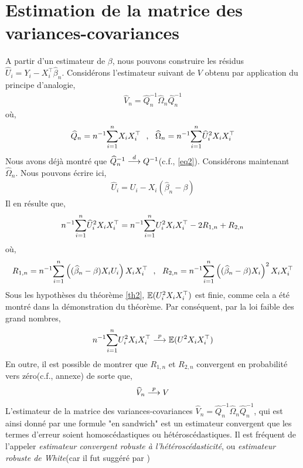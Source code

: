 \documentclass[12pt, reqno]{amsart}
\begin{document}
\section{Estimation de la matrice des variances-covariances}
A partir d'un estimateur de $\beta$, nous pouvons construire les résidus $\widehat{U}_i = Y_i - X_i^\top \widehat{\beta}_n$.  Considérons l'estimateur suivant de $V$ obtenu par application du principe d'analogie,
\begin{align*}
\widehat{V}_n = \widehat{Q}_n^{-1} \widehat{\Omega}_n \widehat{Q}_n^{-1}
\end{align*}
où,
\begin{align*}
\widehat{Q}_n = n^{-1}\underset{i=1}{\overset{n}{\sum}} X_iX_i^\top \ \ , \ \ \widehat{\Omega}_n = n^{-1}\underset{i=1}{\overset{n}{\sum}} \widehat{U}_i^2 X_iX_i^\top
\end{align*}
Nous avons déjà montré que $\widehat{Q}_n ^{-1} \overset{d}{\longrightarrow} Q^{-1}$(c.f., \eqref{eq2}). Considérons maintenant $\widehat{\Omega}_n$. Nous pouvons écrire ici,
\begin{align*}
 \widehat{U}_i  = U_i - X_i(\widehat{\beta}_n - \beta)
\end{align*}
Il en résulte que,
\begin{align}
n^{-1}\underset{i=1}{\overset{n}{\sum}} \widehat{U}_i^2 X_iX_i^\top = n^{-1} \underset{i=1}{\overset{n}{\sum}} U_i^2X_iX_i^\top - 2R_{1,n} + R_{2,n}
\label{eq5}
\end{align}
où,
\begin{align*}
R_{1,n} = n^{-1} \sumobs \left((\widehat{\beta}_n - \beta)X_iU_i\right)X_iX_i^\top \ \  , \ \ 
R_{2,n} = n^{-1} \sumobs \left((\widehat{\beta}_n - \beta)X_i\right)^2X_iX_i^\top
\end{align*}
Sous les hypothèses du théorème \ref{th2}, $\mathbb{E}(U_i^2X_iX_i^\top)$ est finie, comme cela a été montré dans la démonstration du théorème. Par conséquent, par la loi faible des grand nombres,
\begin{align*}
n^{-1} \underset{i=1}{\overset{n}{\sum}} U_i^2 X_iX_i^\top \overset{p}{\longrightarrow} \mathbb{E}(U^2X_iX_i^\top)
\end{align*}
En outre, il est possible de montrer que $R_{1,n}$ et $R_{2,n}$ convergent en probabilité vers zéro(c.f., annexe) de sorte que,
\begin{align*}
\widehat{V}_n \overset{p}{\longrightarrow} V
\end{align*}
L'estimateur de la matrice des variances-covariances $\widehat{V}_n = \widehat{Q}_n^{-1} \widehat{\Omega}_n  \widehat{Q}_n^{-1}$, qui est ainsi donné par une formule "en sandwich" est un estimateur convergent que les termes d'erreur soient homoscédastiques ou hétéroscédastiques. Il est fréquent de l'appeler \emph{estimateur convergent robuste à l'hétéroscédasticité}, ou \emph{estimateur robuste de White}(car il fut suggéré par \citep{White1980})
\end{document}
